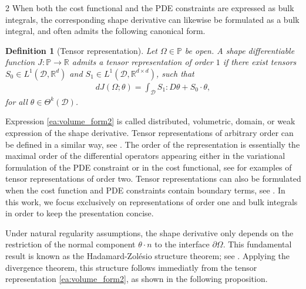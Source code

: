 \documentclass[a4paper, oneside]{article}
\newcommand{\hold}{\mathcal{D}}
\newcommand{\Sb}{S}
\newcommand{\Om}{\Omega}
\newcommand{\VV}{\theta}
\newcommand{\R}{\mathds{R}}
\newcommand{\ddo}{:}
\newtheorem{definition}{Definition}
\begin{document}
\begin{multicols}{2}
	When both the cost functional and the PDE constraints are expressed as bulk integrals, the corresponding shape derivative can likewise be formulated as a bulk integral, and often admits the following canonical form.
	\begin{definition}[Tensor representation]\label{def:tensor2}
	Let $\Om\in \mathds{P}$ be open.
	A shape differentiable function $J : \mathds{P} \rightarrow \R$  admits  a tensor representation of order $1$ if
	there exist tensors $\Sb_0\in L^1(\hold,\R^{d})$  and $\Sb_1\in L^1(\hold,\R^{d\times d})$, such that
	\begin{align}
	\label{ea:volume_form2}
	dJ(\Omega ;\VV) = \int_\hold \Sb_1 \ddo D\VV +  \Sb_0\cdot \VV,
	\end{align}
	for all  $\VV\in \Theta^k(\hold)$. 
	\end{definition}
	Expression \eqref{ea:volume_form2} is called distributed, volumetric, domain, or weak expression of the shape derivative.
	Tensor representations of arbitrary order can be defined in a similar way, see \cite{MR3535238}.
The order of the representation is essentially the maximal order of the differential operators appearing either in the variational formulation of the PDE constraint or in the cost functional, see \cite{MR4531392,LL2024} for examples of tensor representations of order two. 
Tensor representations can also be formulated when the cost function and PDE constraints contain boundary terms, see \cite{MR3535238}.
In this work, we focus exclusively on representations of order one and bulk integrals in order to keep the presentation concise.

	Under natural regularity assumptions, the shape derivative only depends on the restriction of the normal component $\VV\cdot n$ to the interface $\partial\Om$.  
	This fundamental result is known as the Hadamard-Zol\'esio structure theorem; see \cite[pp. 480-481]{MR2731611}.  
Applying the divergence theorem, this structure follows immediatly from the tensor representation \eqref{ea:volume_form2}, as shown in the following proposition.


\end{multicols}
\end{document}
